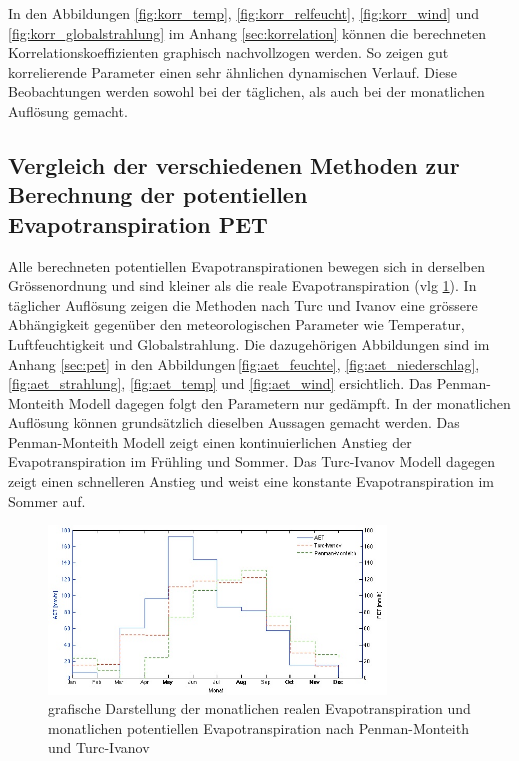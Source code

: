In den Abbildungen \ref{fig:korr_temp}, \ref{fig:korr_relfeucht}, \ref{fig:korr_wind} und \ref{fig:korr_globalstrahlung} im Anhang \ref{sec:korrelation} können die berechneten Korrelationskoeffizienten graphisch nachvollzogen werden. So zeigen gut korrelierende Parameter einen sehr ähnlichen dynamischen Verlauf. Diese Beobachtungen werden sowohl bei der täglichen, als auch bei der monatlichen Auflösung gemacht.

\subsection{Vergleich der verschiedenen Methoden zur Berechnung der potentiellen Evapotranspiration PET}

Alle berechneten potentiellen Evapotranspirationen bewegen sich in derselben Grössenordnung und sind kleiner als die reale Evapotranspiration (vlg \ref{fig:aet_pet_m}). In täglicher Auflösung zeigen die Methoden nach Turc und Ivanov eine grössere Abhängigkeit gegenüber den meteorologischen Parameter wie Temperatur, Luftfeuchtigkeit und Globalstrahlung. Die dazugehörigen Abbildungen sind im Anhang \ref{sec:pet} in den Abbildungen\,\ref{fig:aet_feuchte}, \ref{fig:aet_niederschlag}, \ref{fig:aet_strahlung}, \ref{fig:aet_temp} und \ref{fig:aet_wind} ersichtlich. Das Penman-Monteith Modell dagegen folgt den Parametern nur gedämpft. In der monatlichen Auflösung können grundsätzlich dieselben Aussagen gemacht werden. Das Penman-Monteith Modell zeigt einen kontinuierlichen Anstieg der Evapotranspiration im Frühling und Sommer. Das Turc-Ivanov Modell dagegen zeigt einen schnelleren Anstieg und weist eine konstante Evapotranspiration im Sommer auf.

\begin{figure}[H]
\centering
\includegraphics[width=0.8\textwidth]{figures/lys1_aet_pet_m.jpg}
\caption{grafische Darstellung der monatlichen realen Evapotranspiration und monatlichen potentiellen Evapotranspiration nach Penman-Monteith und Turc-Ivanov}
\label{fig:aet_pet_m}
\end{figure}


